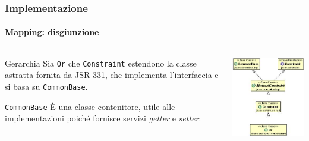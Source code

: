 \documentclass{beamer}
\begin{document}
\begin{frame}[fragile]
\frametitle{Implementazione}
\framesubtitle{Mapping: disgiunzione}
\begin{columns}
\begin{column}{0.55\textwidth}
\begin{block}{Gerarchia}
Sia \texttt{Or} che \texttt{Constraint} estendono la classe astratta
fornita da JSR-331, che implementa l'interfaccia e si basa su
\texttt{CommonBase}.
\end{block}
\begin{block}{\texttt{CommonBase}}
\`E  una classe contenitore, utile alle implementazioni poiché
fornisce servizi \emph{getter} e \emph{setter}.
\end{block}
\end{column}
\begin{column}{0.4\textwidth}
\begin{flushleft}
\includegraphics[scale=0.45]{../relazione/img/Or.JPG}
\end{flushleft}
\end{column}
\end{columns}
\end{frame}
\end{document}

